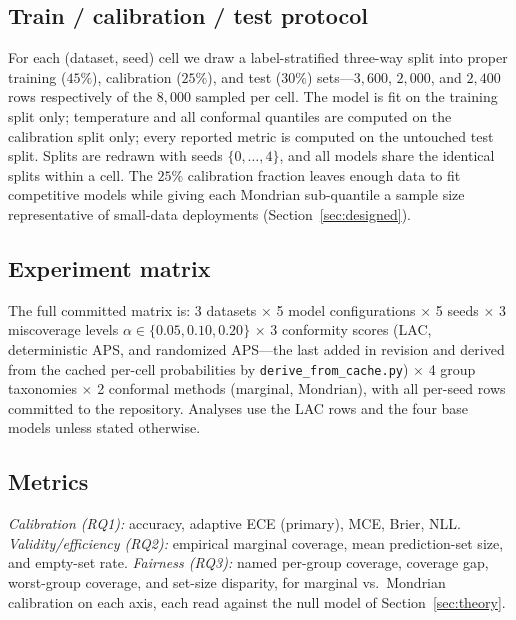 \documentclass[review,12pt]{elsarticle}
\begin{document}
\subsection{Train / calibration / test protocol}
For each (dataset, seed) cell we draw a label-stratified three-way split into proper training ($45\%$), calibration ($25\%$), and test ($30\%$) sets---$3{,}600$, $2{,}000$, and $2{,}400$ rows respectively of the $8{,}000$ sampled per cell. The model is fit on the training split only; temperature and all conformal quantiles are computed on the calibration split only; every reported metric is computed on the untouched test split. Splits are redrawn with seeds $\{0,\dots,4\}$, and all models share the identical splits within a cell. The $25\%$ calibration fraction leaves enough data to fit competitive models while giving each Mondrian sub-quantile a sample size representative of small-data deployments (Section~\ref{sec:designed}).

\subsection{Experiment matrix}
The full committed matrix is: 3 datasets $\times$ 5 model configurations $\times$ 5 seeds $\times$ 3 miscoverage levels $\alpha \in \{0.05, 0.10, 0.20\}$ $\times$ 3 conformity scores (LAC, deterministic APS, and randomized APS---the last added in revision and derived from the cached per-cell probabilities by \texttt{derive\_from\_cache.py}) $\times$ 4 group taxonomies $\times$ 2 conformal methods (marginal, Mondrian), with all per-seed rows committed to the repository. Analyses use the LAC rows and the four base models unless stated otherwise.

\subsection{Metrics}
\emph{Calibration (RQ1):} accuracy, adaptive ECE (primary), MCE, Brier, NLL. \emph{Validity/efficiency (RQ2):} empirical marginal coverage, mean prediction-set size, and empty-set rate. \emph{Fairness (RQ3):} named per-group coverage, coverage gap, worst-group coverage, and set-size disparity, for marginal vs.\ Mondrian calibration on each axis, each read against the null model of Section~\ref{sec:theory}.
\end{document}
